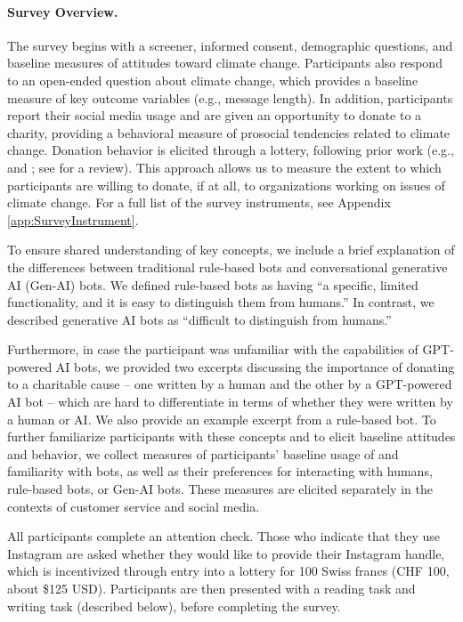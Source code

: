 \documentclass[12pt,notitlepage]{article}
\theoremstyle{plain}
\theoremstyle{plain}
\theoremstyle{definition}
\theoremstyle{definition}
\theoremstyle{assumption}
\theoremstyle{plain}
\theoremstyle{plain}
\theoremstyle{plain}
\theoremstyle{plain}
\theoremstyle{definition}%
\theoremstyle{plain}
\theoremstyle{plain}
\theoremstyle{plain}
\theoremstyle{plain}
\begin{document}
\paragraph{Survey Overview.} The survey begins with a screener, informed consent, demographic questions, and baseline measures of attitudes toward climate change. Participants also respond to an open-ended question about climate change, which provides a baseline measure of key outcome variables (e.g., message
length). In addition, participants report their social media usage and are given an opportunity to donate to a charity, providing a behavioral measure of prosocial tendencies related to climate change. Donation behavior is elicited through a lottery, following prior work (e.g., \citealt{song2024closing} and \citealt{alesina2023immigration}; see \citealt{stantchevasurveys2023} for a review). This approach allows us to measure the extent to which participants are willing to donate, if at all, to organizations working on issues of climate change. For a full list of the survey instruments, see Appendix \ref{app:SurveyInstrument}. 


To ensure shared understanding of key concepts, we include a brief explanation of the differences between traditional rule-based bots and conversational generative AI (Gen-AI) bots. We defined rule-based bots as having ``a specific, limited functionality, and it is easy to distinguish them from humans.'' In contrast, we described generative AI bots as ``difficult to distinguish from humans.'' 


Furthermore, in case the participant was unfamiliar with the capabilities of GPT-powered AI bots, we provided two excerpts discussing the importance of donating to a charitable cause -- one written by a human and the
other by a GPT-powered AI bot -- which are hard to differentiate in terms of whether they were written by a human or AI. We also provide an example excerpt from a rule-based bot. To further familiarize participants with these concepts and to elicit baseline attitudes and behavior, we collect measures of participants' baseline usage of and familiarity with bots, as well as their preferences for interacting with humans, rule-based bots, or Gen-AI bots. These measures are elicited separately in the contexts of customer service and social media.


All participants complete an attention check. Those who indicate that they use Instagram are asked whether they would like to provide their Instagram handle, which is incentivized through entry into a lottery for 100 Swiss francs (CHF 100, about \$125 USD). Participants are then presented with a reading task and writing task (described below), before completing the survey.
\end{document}
